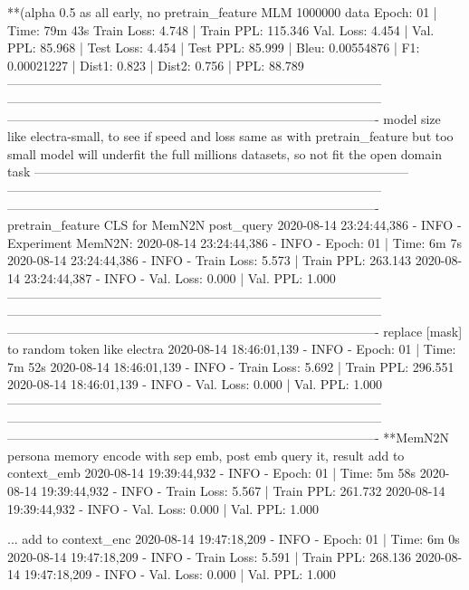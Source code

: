 \documentclass[letterpaper]{article} %
\begin{document}
\begin{CJK*}{UTF8}{gbsn}
**(alpha 0.5 as all early, no pretrain_feature MLM %
1000000 data
Epoch: 01 | Time: 79m 43s
	Train Loss: 4.748 | Train PPL: 115.346
	 Val. Loss: 4.454 |  Val. PPL:  85.968
| Test Loss: 4.454 | Test PPL:  85.999 |
Bleu: 0.00554876 | F1: 0.00021227 | Dist1: 0.823 | Dist2: 0.756 | PPL:  88.789
-----------------------------------------------------------------------------------------
-----------------------------------------------------------------------------------------
----------------------------------------------------------------------------------------
model size like electra-small, to see if speed and loss same as with pretrain_feature
but too small model will underfit the full millions datasets, so not fit the open domain task
-----------------------------------------------------------------------------------------
-----------------------------------------------------------------------------------------
----------------------------------------------------------------------------------------
pretrain_feature CLS for MemN2N post_query
2020-08-14 23:24:44,386 - INFO - Experiment MemN2N: 
2020-08-14 23:24:44,386 - INFO - Epoch: 01 | Time: 6m 7s
2020-08-14 23:24:44,386 - INFO - 	Train Loss: 5.573 | Train PPL: 263.143
2020-08-14 23:24:44,387 - INFO - 	 Val. Loss: 0.000 |  Val. PPL:   1.000
-----------------------------------------------------------------------------------------
-----------------------------------------------------------------------------------------
----------------------------------------------------------------------------------------
replace [mask] to random token like electra
2020-08-14 18:46:01,139 - INFO - Epoch: 01 | Time: 7m 52s
2020-08-14 18:46:01,139 - INFO - 	Train Loss: 5.692 | Train PPL: 296.551
2020-08-14 18:46:01,139 - INFO - 	 Val. Loss: 0.000 |  Val. PPL:   1.000
-----------------------------------------------------------------------------------------
-----------------------------------------------------------------------------------------
----------------------------------------------------------------------------------------
**MemN2N persona memory encode with sep emb, post emb query it, result add to context_emb
2020-08-14 19:39:44,932 - INFO - Epoch: 01 | Time: 5m 58s
2020-08-14 19:39:44,932 - INFO - 	Train Loss: 5.567 | Train PPL: 261.732
2020-08-14 19:39:44,932 - INFO - 	 Val. Loss: 0.000 |  Val. PPL:   1.000

... add to context_enc
2020-08-14 19:47:18,209 - INFO - Epoch: 01 | Time: 6m 0s
2020-08-14 19:47:18,209 - INFO - 	Train Loss: 5.591 | Train PPL: 268.136
2020-08-14 19:47:18,209 - INFO - 	 Val. Loss: 0.000 |  Val. PPL:   1.000


\end{CJK*}
\end{document}
